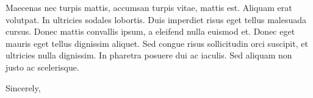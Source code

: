 \documentclass[11pt]{cicsletter}
\begin{document}
\begin{letter}
    Maecenas nec turpis mattis, accumsan turpis vitae, mattis est. Aliquam erat volutpat. In ultricies sodales lobortis. Duis imperdiet risus eget tellus malesuada cursus. Donec mattis convallis ipsum, a eleifend nulla euismod et. Donec eget mauris eget tellus dignissim aliquet. Sed congue risus sollicitudin orci suscipit, et ultricies nulla dignissim. In pharetra posuere dui ac iaculis. Sed aliquam non justo ac scelerisque.
    \closing{Sincerely,}

\end{letter}
\end{document}
